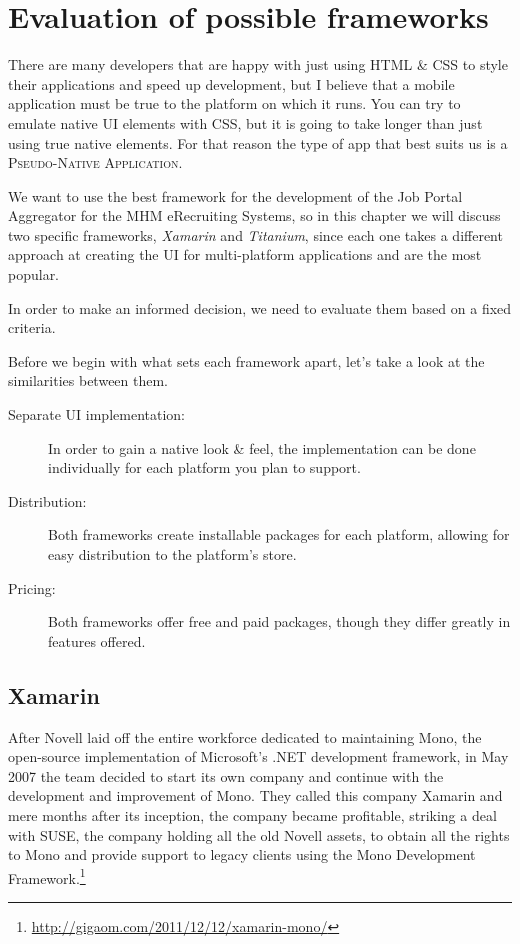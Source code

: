 \chapter{Evaluation of possible frameworks}\label{ch:evaluation}

There are many developers that are happy with just using HTML \& CSS to style their applications and speed up development, but I believe that a mobile application must be true to the platform on which it runs. You can try to emulate native \ac{UI} elements with CSS, but it is going to take longer than just using true native elements. For that reason the type of app that best suits us is a \textsc{Pseudo-Native Application}. 

We want to use the best framework for the development of the Job Portal Aggregator for the MHM eRecruiting Systems, so in this chapter we will discuss two specific frameworks, \emph{Xamarin} and \emph{Titanium}, since each one takes a different approach at creating the \ac{UI} for multi-platform applications and are the most popular.

In order to make an informed decision, we need to evaluate them based on a fixed criteria.

 

Before we begin with what sets each framework apart, let's take a look at the similarities between them.

\begin{description}
\item[Separate UI implementation:] In order to gain a native look \& feel, the implementation can be done individually for each platform you plan to support.
\item[Distribution:] Both frameworks create installable packages for each platform, allowing for easy distribution to the platform's store.
\item[Pricing:] Both frameworks offer free and paid packages, though they differ greatly in features offered.   
\end{description}


\section{Xamarin}
After Novell laid off the entire workforce dedicated to maintaining Mono, the open-source implementation of Microsoft's .NET development framework, in May 2007 the team decided to start its own company and continue with the development and improvement of Mono. They called this company Xamarin and mere months after its inception, the company became profitable, striking a deal with SUSE, the company holding all the old Novell assets, to obtain all the rights to Mono and provide support to legacy clients using the Mono Development Framework.\footnote{\url{http://gigaom.com/2011/12/12/xamarin-mono/}}

